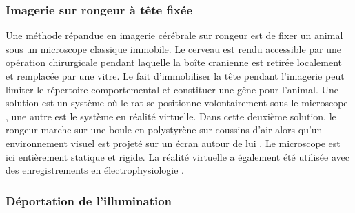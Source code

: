 
\subsubsection{Imagerie sur rongeur à tête fixée}

Une méthode répandue en imagerie cérébrale sur rongeur est de fixer un animal sous un microscope classique immobile. Le cerveau est rendu accessible par une opération chirurgicale pendant laquelle la boîte cranienne est retirée localement et remplacée par une vitre. Le fait d'immobiliser la tête pendant l'imagerie peut limiter le répertoire comportemental et constituer une gêne pour l'animal. Une solution est un système où le rat se positionne volontairement sous le microscope \cite{scott_cellular_2013}, une autre est le système en réalité virtuelle. Dans cette deuxième solution, le rongeur marche sur une boule en polystyrène sur coussins d'air alors qu'un environnement visuel est projeté sur un écran autour de lui \cite{dombeck_functional_2010}. Le microscope est ici entièrement statique et rigide. La réalité virtuelle a également été utilisée avec des enregistrements en électrophysiologie \cite{aronov_engagement_2014}\cite{whitlock_navigating_2014}.




\subsubsection{Déportation de l'illumination}

